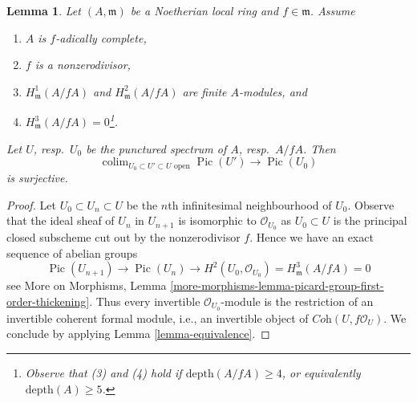 \documentclass{stacks-project}
\theoremstyle{plain}
\newtheorem{lemma}[subsection]{Lemma}
\theoremstyle{definition}
\theoremstyle{remark}
\numberwithin{equation}{subsection}
\def\colim{\mathop{\mathrm{colim}}\nolimits}
\def\Pic{\mathop{\mathrm{Pic}}\nolimits}
\begin{document}
\begin{lemma}
\label{lemma-surjective-Pic-first}
Let $(A, \mathfrak m)$ be a Noetherian local ring and $f \in \mathfrak m$.
Assume
\begin{enumerate}
\item $A$ is $f$-adically complete,
\item $f$ is a nonzerodivisor,
\item $H^1_\mathfrak m(A/fA)$ and $H^2_\mathfrak m(A/fA)$
are finite $A$-modules, and
\item $H^3_\mathfrak m(A/fA) = 0$\footnote{Observe that (3) and (4) hold
if $\text{depth}(A/fA) \geq 4$, or equivalently $\text{depth}(A) \geq 5$.}.
\end{enumerate}
Let $U$, resp.\ $U_0$ be the punctured spectrum of $A$, resp.\ $A/fA$.
Then
$$
\colim_{U_0 \subset U' \subset U\text{ open}} \Pic(U')
\longrightarrow
\Pic(U_0)
$$
is surjective.
\end{lemma}

\begin{proof}
Let $U_0 \subset U_n \subset U$ be the $n$th infinitesimal neighbourhood
of $U_0$. Observe that the ideal sheaf of $U_n$ in $U_{n + 1}$ is
isomorphic to $\mathcal{O}_{U_0}$ as $U_0 \subset U$ is the principal
closed subscheme cut out by the nonzerodivisor $f$. Hence we have
an exact sequence of abelian groups
$$
\Pic(U_{n + 1}) \to \Pic(U_n) \to
H^2(U_0, \mathcal{O}_{U_0}) = H^3_\mathfrak m(A/fA) = 0
$$
see More on Morphisms, Lemma
\ref{more-morphisms-lemma-picard-group-first-order-thickening}.
Thus every invertible $\mathcal{O}_{U_0}$-module is the restriction
of an invertible coherent formal module, i.e., an invertible object of
$\textit{Coh}(U, f\mathcal{O}_U)$. We conclude by applying
Lemma \ref{lemma-equivalence}.
\end{proof}
\end{document}
